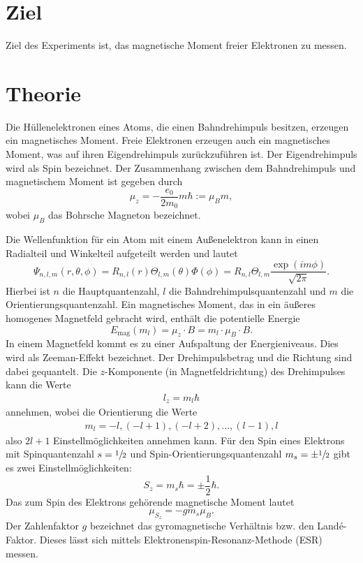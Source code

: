 \section{Ziel}
Ziel des Experiments ist, das magnetische Moment freier Elektronen zu messen.

\section{Theorie}
Die Hüllenelektronen eines Atoms, die einen Bahndrehimpuls besitzen, erzeugen ein magnetisches Moment.
Freie Elektronen erzeugen auch ein magnetisches Moment, was auf ihren Eigendrehimpuls zurückzuführen ist.
Der Eigendrehimpuls wird als Spin bezeichnet.
Der Zusammenhang zwischen dem Bahndrehimpuls und magnetischem Moment ist gegeben durch
\begin{equation}
  \mu_z = -\frac{e_0}{2m_0}m\hbar := \mu_Bm,
\end{equation}
wobei $\mu_B$ das Bohrsche Magneton bezeichnet.

Die Wellenfunktion für ein Atom mit einem Außenelektron kann in einen Radialteil und Winkelteil aufgeteilt werden und lautet
\begin{equation*}
  \Psi_{n,l,m}(r,\theta,\phi) = R_{n,l}(r)\Theta_{l,m}(\theta)\Phi(\phi) = R_{n,l}\Theta_{l,m}\frac{\exp(im\phi)}{\sqrt{2\pi}}.
\end{equation*}
Hierbei ist $n$ die Hauptquantenzahl, $l$ die Bahndrehimpulsquantenzahl und $m$ die Orientierungsquantenzahl.
Ein magnetisches Moment, das in ein äußeres homogenes Magnetfeld gebracht wird, enthält die potentielle Energie
\begin{equation*}
  E_{\text{mag}}(m_l) = \mu_z\cdot{B} = m_l\cdot\mu_B\cdot{B}.
\end{equation*}
In einem Magnetfeld kommt es zu einer Aufspaltung der Energieniveaus.
Dies wird als Zeeman-Effekt bezeichnet.
Der Drehimpulsbetrag und die Richtung sind dabei gequantelt.
Die $z$-Komponente (in Magnetfeldrichtung) des Drehimpulses kann die Werte
\begin{align*}
  l_z = m_l \hbar
\end{align*}
annehmen, wobei die Orientierung die Werte
\begin{align*}
  m_l = -l, (-l+1),(-l+2),...,(l-1),l
\end{align*}
also $2l+1$ Einstellmöglichkeiten annehmen kann.
Für den Spin eines Elektrons mit Spinquantenzahl $s = \sfrac{1}{2}$ und Spin-Orientierungsquantenzahl $m_s = \pm\sfrac{1}{2}$ gibt es zwei Einstellmöglichkeiten:
\begin{equation*}
  S_z = m_s\hbar = \pm\frac{1}{2}\hbar.
\end{equation*}
Das zum Spin des Elektrons gehörende magnetische Moment lautet
\begin{equation}
  \mu_{S_z} = -gm_s\mu_B.
\end{equation}
Der Zahlenfaktor $g$ bezeichnet das gyromagnetische Verhältnis bzw. den Landé-Faktor.
Dieses lässt sich mittels Elektronenspin-Resonanz-Methode (ESR) messen.

